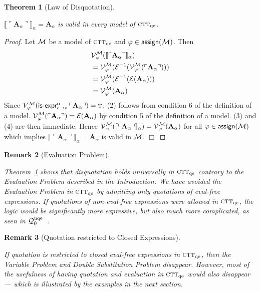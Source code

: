 \documentclass[fleqn]{llncs}
\newcommand{\bsp}{\begin{sloppypar}}
\newcommand{\esp}{\end{sloppypar}}
\newtheorem{thm}{Theorem}[subsection]
\newtheorem{rem}[thm]{Remark}
\newcommand{\sE}{\mbox{$\cal E$}}
\newcommand{\sM}{\mbox{$\cal M$}}
\newcommand{\sV}{\mbox{$\cal V$}}
\renewcommand{\phi}{\varphi}
\newcommand{\churchqe}{$\mbox{\sc ctt}_{\rm qe}$}
\newcommand{\qzerouqe}{${\cal Q}^{\rm uqe}_{0}$}
\newcommand{\sembrack}[1]{\llbracket#1\rrbracket}
\newcommand{\synbrack}[1]{\ulcorner#1\urcorner}
\newcommand{\mname}[1]{\mbox{\sf #1}}
\newcommand{\tarrow}{\rightarrow}
\newcommand{\TRUE}{\mbox{{\sc t}}}
\begin{document}
\begin{thm}[Law of Disquotation] \label{thm:disquotation}\bsp
$\sembrack{\synbrack{\textbf{A}_\alpha}}_\alpha = \textbf{A}_\alpha$
  is valid in every model of {\churchqe}.\esp
\end{thm}

\begin{proof}\bsp
Let $\sM$ be a model of {\churchqe} and $\phi \in
\mname{assign}(\sM)$.  Then
\begin{align} \setcounter{equation}{0}
&
\sV^{\cal M}_{\phi}(\sembrack{\synbrack{\textbf{A}_\alpha}}_\alpha) \\
&=
\sV^{\cal M}_{\phi}(\sE^{-1}(\sV^{\cal M}_{\phi}(\synbrack{\textbf{A}_\alpha}))) \\
&=
\sV^{\cal M}_{\phi}(\sE^{-1}(\sE(\textbf{A}_\alpha))) \\
&=
\sV^{\cal M}_{\phi}(\textbf{A}_\alpha)
\end{align}
Since $V^{\cal M}_{\phi}(\mname{is-expr}_{\epsilon \tarrow o}^{\alpha}
\, \synbrack{\textbf{A}_\alpha}) = \TRUE$, (2) follows from condition
6 of the definition of a model. $\sV^{\cal
  M}_{\phi}(\synbrack{\textbf{A}_\alpha}) = \sE(\textbf{A}_\alpha)$ by
condition 5 of the definition of a model.  (3) and (4) are then
immediate.  Hence $\sV^{\cal
  M}_{\phi}(\sembrack{\synbrack{\textbf{A}_\alpha}}_\alpha) =
\sV^{\cal M}_{\phi}(\textbf{A}_\alpha)$ for all $\phi \in
\mname{assign}(\sM)$ which implies
$\sembrack{\synbrack{\textbf{A}_\alpha}}_\alpha = \textbf{A}_\alpha$
is valid in $\sM$. \hfill $\Box$\esp
\end{proof}

\begin{rem}[Evaluation Problem]\em\bsp
Theorem~\ref{thm:disquotation} shows that disquotation holds
universally in {\churchqe} contrary to the Evaluation Problem
described in the Introduction.  We have avoided the Evaluation Problem
in {\churchqe} by admitting only quotations of eval-free expressions.
If quotations of non-eval-free expressions were allowed in
{\churchqe}, the logic would be significantly more expressive, but
also much more complicated, as seen in
{\qzerouqe}~\cite{FarmerArxiv14}.\esp
\end{rem}

\begin{rem}[Quotation restricted to Closed Expressions]\em \bsp
If quotation is restricted to closed eval-free expressions in
{\churchqe}, then the Variable Problem and Double Substitution Problem
disappear.  However, most of the usefulness of having quotation and
evaluation in {\churchqe} would also disappear --- which is
illustrated by the examples in the next section.\esp
\end{rem}
\end{document}
